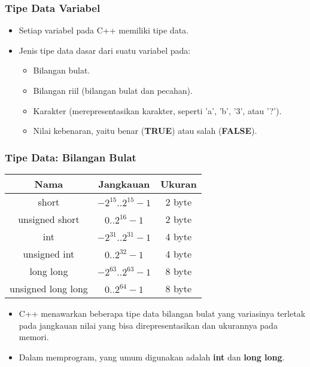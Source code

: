 \begin{frame}
\frametitle{Tipe Data Variabel}
\begin{itemize}
  \item Setiap variabel pada C++ memiliki \alert{tipe data}.
  \item Jenis tipe data dasar dari suatu variabel pada:
  \begin{itemize}
    \item Bilangan bulat.
    \item Bilangan riil (bilangan bulat dan pecahan).
    \item Karakter (merepresentasikan karakter, seperti 'a', 'b', '3', atau '?').
    \item Nilai kebenaran, yaitu benar (\textbf{TRUE}) atau salah (\textbf{FALSE}).
  \end{itemize}
\end{itemize}
\end{frame}

\begin{frame}
\frametitle{Tipe Data: Bilangan Bulat}
\begin{table}[ht]
  \begin{tabular}{|c|c|c|}
    \hline Nama  & Jangkauan  & Ukuran \\
    \hline short & $-2^{15} .. 2^{15}-1$ & 2 byte\\
    \hline unsigned short & $0 .. 2^{16}-1$ & 2 byte\\
    \hline int & $-2^{31} .. 2^{31}-1$ & 4 byte\\
    \hline unsigned int & $0 .. 2^{32}-1$ & 4 byte\\
    \hline long long & $-2^{63} .. 2^{63}-1$ & 8 byte\\
    \hline unsigned long long & $0 .. 2^{64}-1$ & 8 byte\\
    \hline
  \end{tabular}
\end{table}
\begin{itemize}
  \item C++ menawarkan beberapa tipe data bilangan bulat yang variasinya terletak pada jangkauan nilai yang bisa direpresentasikan dan ukurannya pada memori.
  \item Dalam memprogram, yang umum digunakan adalah \alert{\textbf{int}} dan \alert{\textbf{long long}}.
\end{itemize}
\end{frame}

